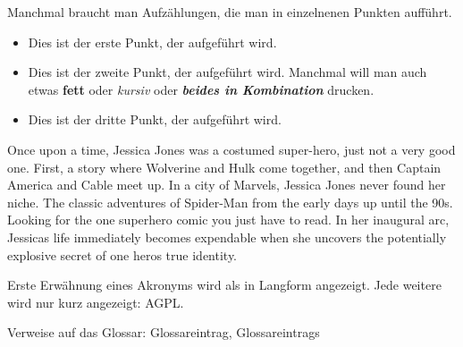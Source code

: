 Manchmal braucht man Aufzählungen, die man in einzelnenen Punkten aufführt.
\begin{itemize}
\item Dies ist der erste Punkt, der aufgeführt wird.
\item Dies ist der zweite Punkt, der aufgeführt wird. Manchmal will man auch etwas \textbf{fett} oder \textit{kursiv} oder \textbf{\textit{beides in Kombination}}  drucken.
\item Dies ist der dritte Punkt, der aufgeführt wird.
\end{itemize}

Once upon a time, Jessica Jones was a costumed super-hero, just not a very good one. First, a story where Wolverine and Hulk come together, and then Captain America and Cable meet up. In a city of Marvels, Jessica Jones never found her niche. The classic adventures of Spider-Man from the early days up until the 90s. Looking for the one superhero comic you just have to read. In her inaugural arc, Jessicas life immediately becomes expendable when she uncovers the potentially explosive secret of one heros true identity.

Erste Erwähnung eines Akronyms wird als in Langform angezeigt. Jede weitere wird
nur kurz angezeigt: \ac{AGPL}. \cite{fsf:2007}

Verweise auf das Glossar: \gls{Glossareintrag}, \glspl{Glossareintrag}

